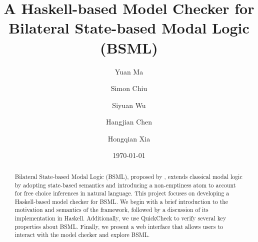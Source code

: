 \documentclass[12pt,a4paper]{article}
\title{A Haskell-based Model Checker for Bilateral State-based Modal Logic (BSML)}
\author{Yuan Ma \and Simon Chiu \and Siyuan Wu \and Hangjian Chen \and Hongqian Xia}
\date{\today}
\begin{document}
\maketitle

\begin{abstract}

    Bilateral State-based Modal Logic (BSML), proposed by \citet{Aloni2024}, 
    extends classical modal logic by adopting state-based semantics and introducing a non-emptiness atom to account for free choice inferences in natural language. 
    This project focuses on developing a Haskell-based model checker for BSML.\@  
    We begin with a brief introduction to the motivation and semantics of the framework, followed by a discussion of its implementation in Haskell.\@ 
    Additionally, we use QuickCheck to verify several key properties about BSML.\@ 
    Finally, we present a web interface that allows users to interact with the model checker and explore BSML.\@

\end{abstract}


\tableofcontents

\clearpage





















\end{document}
